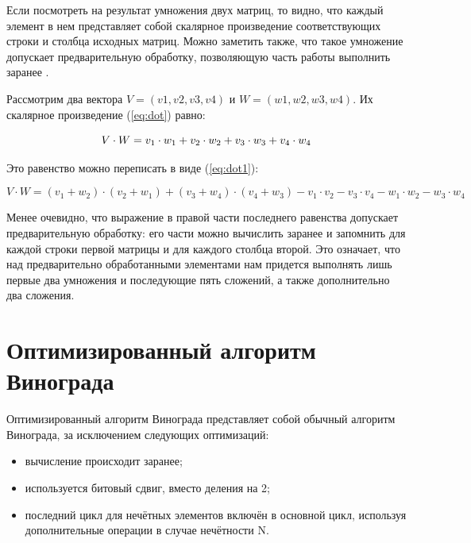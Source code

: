 \documentclass[12pt]{report}
\begin{document}
	Если посмотреть на результат умножения двух матриц, то видно, что каждый элемент в нем представляет собой скалярное произведение соответствующих строки и столбца исходных матриц. Можно заметить также, что такое умножение допускает предварительную обработку, позволяющую часть работы выполнить заранее \cite{winograd}.
	
	Рассмотрим два вектора $V = (v1, v2, v3, v4)$ и $W = (w1, w2, w3, w4)$. Их скалярное произведение (\ref{eq:dot}) равно: 
	
	\begin{equation}
		\label{eq:dot}
		V \cdot W=v_1 \cdot w_1 + v_2 \cdot w_2 + v_3 \cdot w_3 + v_4 \cdot w_4\\
	\end{equation}
	\newline
	
	Это равенство можно переписать в виде (\ref{eq:dot1}):
	
	\begin{equation}
		\label{eq:dot1}
		V \cdot W=(v_1 + w_2) \cdot (v_2 + w_1) + (v_3 + w_4) \cdot (v_4 + w_3) - v_1 \cdot v_2 - 
		v_3 \cdot v_4 - w_1 \cdot w_2 - w_3 \cdot w_4
	\end{equation}
	
	Менее очевидно, что выражение в правой части последнего равенства допускает предварительную обработку: его части можно вычислить заранее и запомнить для каждой строки первой матрицы и для каждого столбца второй. 
	Это означает, что над предварительно обработанными элементами нам придется выполнять лишь первые два умножения и последующие пять сложений, а также дополнительно два сложения.
	
	\section{Оптимизированный алгоритм Винограда}
	Оптимизированный алгоритм Винограда представляет собой обычный алгоритм Винограда, за исключением следующих оптимизаций:
	
	\begin{itemize}
		\item вычисление происходит заранее;
		\item используется битовый сдвиг, вместо деления на 2;
		\item последний цикл для нечётных элементов включён в основной цикл, используя дополнительные операции в случае нечётности N.
	\end{itemize}
	
\end{document}
